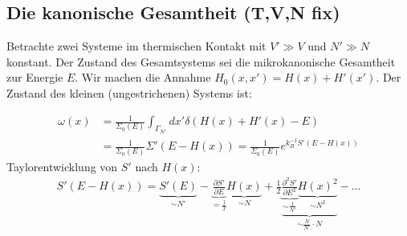 
\vspace{-15pt}

\subsection{Die kanonische Gesamtheit (T,V,N fix)}

Betrachte zwei Systeme im thermischen Kontakt mit $V' \gg V$ und $N' \gg N$ konstant.
Der Zustand des Gesamtsystems sei die mikrokanonische
Gesamtheit zur Energie $E$.
Wir machen die Annahme $H_0(x,x') = H(x) + H'(x')$.
Der Zustand des kleinen (ungestrichenen) Systems ist:

\begin{align*}
    \omega(x) &= \frac{1}{\Sigma_0 (E)} \int_{\Gamma_{N'}} dx' \delta(H(x) + H'(x) - E)
    \\
    &= \frac{1}{\Sigma_0 (E)} \Sigma'(E-H(x))
    = \frac{1}{\Sigma_0 (E)} e^{k_B^{-1} S'(E-H(x))}
\end{align*}
Taylorentwicklung von $S'$ nach $H(x)$:
\begin{align*}
    S'(E-H(x)) = \underbrace{S'(E)}_{\sim N'} - \underbrace{\frac{\partial S'}{\partial E}}_{=\frac{1}{T}}
    \underbrace{H(x)}_{\sim N} + \frac{1}{2} \underbrace{\underbrace{\frac{\partial^2 S'}{\partial E^2}}_{\sim \frac{1}{N'}}
    \underbrace{H(x)^2}_{\sim N^2}}_{\sim \frac{N}{N'} \cdot N} - \dots
\end{align*}

